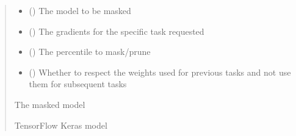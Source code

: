 \documentclass[letterpaper,10pt,english]{sphinxmanual}
\begin{document}
\begin{fulllineitems}
\label{\detokenize{beyondml.tflow.utils:beyondml.tflow.utils.utils.mask_task_weights}}
\pysigstartsignatures
{}
\pysigstopsignatures\begin{quote}\begin{description}
\begin{itemize}
\item {} 
\sphinxAtStartPar
{} () \textendash{} The model to be masked

\item {} 
\sphinxAtStartPar
{} () \textendash{} The gradients for the specific task requested

\item {} 
\sphinxAtStartPar
{} () \textendash{} The percentile to mask/prune

\item {} 
\sphinxAtStartPar
{} (\sphinxstyleliteralemphasis{\sphinxupquote{ (}}\sphinxstyleliteralemphasis{\sphinxupquote{)}}) \textendash{} Whether to respect the weights used for previous tasks and not use them
for subsequent tasks

\end{itemize}

\sphinxAtStartPar
{} \textendash{} The masked model

\sphinxAtStartPar
TensorFlow Keras model

\end{description}\end{quote}

\end{fulllineitems}
\end{document}
